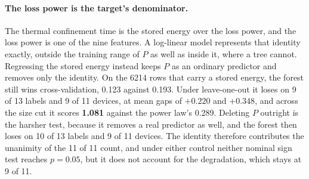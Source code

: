 \documentclass[aip,pop,preprint,amsmath,amssymb]{revtex4-2}
\begin{document}
\paragraph{The loss power is the target's denominator.} The thermal
confinement time is the stored energy over the loss power, and the loss power
is one of the nine features. A log-linear model represents that identity
exactly, outside the training range of $P$ as well as inside it, where a tree
cannot. Regressing the stored energy instead keeps $P$ as an ordinary predictor
and removes only the identity. On the 6214 rows that carry a stored energy, the
forest still wins cross-validation, 0.123 against 0.193. Under leave-one-out it
loses on 9 of 13 labels and 9 of 11 devices, at mean gaps of $+0.220$ and
\textbf{$+0.348$}, and across the size cut it scores \textbf{1.081} against the
power law's 0.289. Deleting $P$ outright is the harsher test, because it removes
a real predictor as well, and the forest then loses on 10 of 13 labels and 9 of
11 devices. The identity therefore contributes the unanimity of the 11 of 11
count, and under either control neither nominal sign test reaches $p=0.05$,
but it
does not account for the degradation, which stays at 9 of 11.
\end{document}
